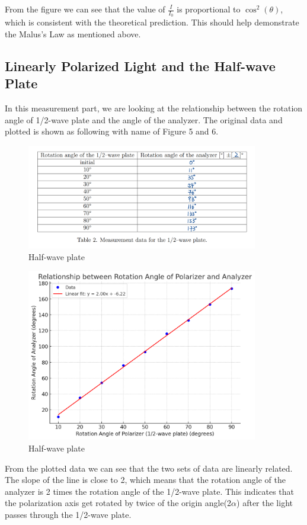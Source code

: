 \documentclass[12pt, a4paper, oneside]{article}
\begin{document}
From the figure we can see that the value of $\frac{I}{I_0}$ is proportional to $\cos^2(\theta)$, which is consistent with the theoretical prediction. This should help
demonstrate the Malus's Law as mentioned above. 

\subsection{Linearly Polarized Light and the Half-wave Plate}
\indent

In this measurement part, we are looking at the relationship between the rotation angle of 1/2-wave plate and the angle of the analyzer. The original data and plotted is shown as following with name of Figure 5 and 6.
\begin{figure}
	\centering
	\includegraphics[width=0.9\textwidth]{HalfWave_Data.png}
	\caption{Half-wave plate}
	\label{fig5}
\end{figure}
\begin{figure}
	\centering
	\includegraphics[width=0.9\textwidth]{HalfWave_Result.png}
	\caption{Half-wave plate}
	\label{fig6}
\end{figure}
From the plotted data we can see that the two sets of data are linearly related. The slope of the line is close to 2, which means that the rotation angle of the analyzer is 2 times the rotation angle of the 1/2-wave plate. 
This indicates that the polarization axis get rotated by twice of the origin angle(2$\alpha$) after the light passes through the 1/2-wave plate.
\end{document}
